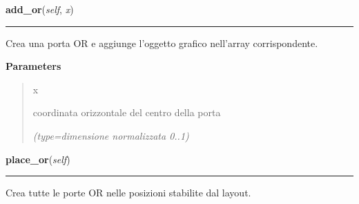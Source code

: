 \hspace{.8\funcindent}\begin{boxedminipage}{\funcwidth}

    \raggedright \textbf{add\_or}(\textit{self}, \textit{x})

    \vspace{-1.5ex}

    \rule{\textwidth}{0.5\fboxrule}
\setlength{\parskip}{2ex}
    Crea una porta OR e aggiunge l'oggetto grafico nell'array 
    corrispondente.

\setlength{\parskip}{1ex}
      \textbf{Parameters}
      \vspace{-1ex}

      \begin{quote}
        \begin{Ventry}{x}

          \item[x]

          coordinata orizzontale del centro della porta

            {\it (type=dimensione normalizzata 0..1)}

        \end{Ventry}

      \end{quote}

    \end{boxedminipage}

    \label{pla:Pla:place_or}

    \vspace{0.5ex}

\hspace{.8\funcindent}\begin{boxedminipage}{\funcwidth}

    \raggedright \textbf{place\_or}(\textit{self})

    \vspace{-1.5ex}

    \rule{\textwidth}{0.5\fboxrule}
\setlength{\parskip}{2ex}
    Crea tutte le porte OR nelle posizioni stabilite dal layout.

\setlength{\parskip}{1ex}
    \end{boxedminipage}

    \label{pla:Pla:add_not}

    \vspace{0.5ex}

